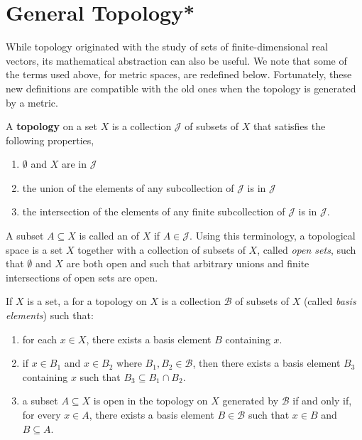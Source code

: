 \section{General Topology*}

While topology originated with the study of sets of finite-dimensional real vectors, its mathematical abstraction can also be useful.
We note that some of the terms used above, for metric spaces, are redefined below.
Fortunately, these new definitions are compatible with the old ones when the topology is generated by a metric.

\begin{definition}
A \textbf{topology} on a set $X$ is a collection $\mathcal{J}$ of subsets of $X$ that satisfies the following properties,
\begin{enumerate}
\item $\emptyset$ and $X$ are in $\mathcal{J}$
\item the union of the elements of any subcollection of $\mathcal{J}$ is in $\mathcal{J}$
\item the intersection of the elements of any finite subcollection of $\mathcal{J}$ is in $\mathcal{J}$.
\end{enumerate}
\end{definition}

A subset $A \subseteq X$ is called an  of $X$ if $A \in \mathcal{J}$.
Using this terminology, a topological space is a set $X$ together with a collection of subsets of $X$, called \emph{open sets}, such that $\emptyset$ and $X$ are both open and such that arbitrary unions and finite intersections of open sets are open.

\begin{definition}
\label{definition:topology_basis}
If $X$ is a set, a  for a topology on $X$ is a collection $\mathcal{B}$ of subsets of $X$ (called \emph{basis elements}) such that:
\begin{enumerate}
\item for each $x \in X$, there exists a basis element $B$ containing $x$.
\item if $x \in B_1$ and $x \in B_2$ where $B_1, B_2 \in \mathcal{B}$, then there exists a basis element $B_3$ containing $x$ such that $B_3 \subseteq B_1 \cap B_2$.
\item a subset $A \subseteq X$ is open in the topology on $X$ generated by $\mathcal{B}$ if and only if, for every $x \in A$, there exists a basis element $B \in \mathcal{B}$ such that $x \in B$ and $B \subseteq A$.
\end{enumerate}
\end{definition}

